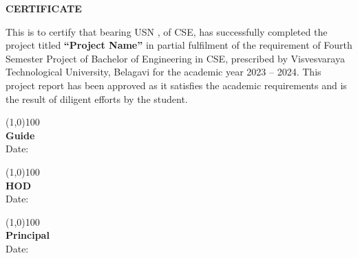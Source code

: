 \documentclass[a4paper,12pt]{article}
\begin{document}
	
	\begin{center}
		\LARGE \textbf{CERTIFICATE}
	\end{center}
	
	\vspace{2cm}
	
	\noindent \hspace{1cm} This is to certify that \underline{\hspace{5cm}} bearing USN \underline{\hspace{2cm}}, of CSE, has successfully completed the project titled \textbf{“Project Name”} in partial fulfilment of the requirement of Fourth Semester Project of Bachelor of Engineering in CSE, prescribed by Visvesvaraya Technological University, Belagavi for the academic year 2023 – 2024. This project report has been approved as it satisfies the academic requirements and is the result of diligent efforts by the student. \\[2cm]
	
	
	\vspace{5cm}
	\noindent
	\begin{minipage}{5cm}
		\begin{flushleft}
			\vspace{3cm}
			\line(1,0){100}\\
			\textbf{Guide}\\
			Date:
		\end{flushleft}
	\end{minipage}
	\hspace{1.5cm}
	\begin{minipage}{5cm}
		\begin{flushleft}
			\vspace{3cm}
			\line(1,0){100}\\
			\textbf{HOD}\\
			Date:
		\end{flushleft}
	\end{minipage}
	\hspace{1.5cm}
	\begin{minipage}{5cm}
		\begin{flushleft}
			\vspace{3cm}
			\line(1,0){100}\\
			\textbf{Principal}\\
			Date:
		\end{flushleft}
	\end{minipage}
	
\end{document}
